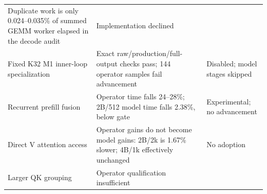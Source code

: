 \documentclass[10pt,a4paper]{article}
\begin{document}
\begin{longtable}[]{@{}lll@{}}
\begin{minipage}[t]{0.30\columnwidth}
Duplicate work is only 0.024--0.035\% of summed GEMM worker elapsed in
the decode audit\strut
\end{minipage} & \begin{minipage}[t]{0.30\columnwidth}\raggedright
Implementation declined\strut
\end{minipage}\tabularnewline
\begin{minipage}[t]{0.30\columnwidth}\raggedright
Fixed K32 M1 inner-loop specialization\strut
\end{minipage} & \begin{minipage}[t]{0.30\columnwidth}\raggedright
Exact raw/production/full-output checks pass; 144 operator samples fail
advancement\strut
\end{minipage} & \begin{minipage}[t]{0.30\columnwidth}\raggedright
Disabled; model stages skipped\strut
\end{minipage}\tabularnewline
\begin{minipage}[t]{0.30\columnwidth}\raggedright
Recurrent prefill fusion\strut
\end{minipage} & \begin{minipage}[t]{0.30\columnwidth}\raggedright
Operator time falls 24--28\%; 2B/512 model time falls 2.38\%, below
gate\strut
\end{minipage} & \begin{minipage}[t]{0.30\columnwidth}\raggedright
Experimental; no advancement\strut
\end{minipage}\tabularnewline
\begin{minipage}[t]{0.30\columnwidth}\raggedright
Direct V attention access\strut
\end{minipage} & \begin{minipage}[t]{0.30\columnwidth}\raggedright
Operator gains do not become model gains: 2B/2k is 1.67\% slower; 4B/1k
effectively unchanged\strut
\end{minipage} & \begin{minipage}[t]{0.30\columnwidth}\raggedright
No adoption\strut
\end{minipage}\tabularnewline
\begin{minipage}[t]{0.30\columnwidth}\raggedright
Larger QK grouping\strut
\end{minipage} & \begin{minipage}[t]{0.30\columnwidth}\raggedright
Operator qualification insufficient\strut
\end{minipage} & \begin{minipage}[t]{0.30\columnwidth}\raggedright

\end{minipage}
\end{longtable}
\end{document}
